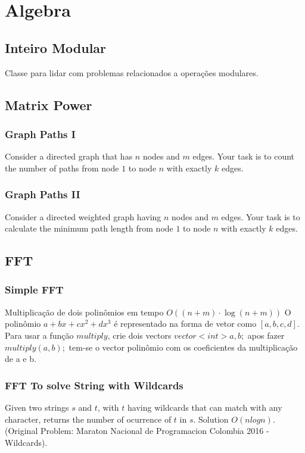 \chapter{Algebra}
    
    \section{Inteiro Modular}
    Classe para lidar com problemas relacionados a operações modulares.
    
    
    \section{Matrix Power}
    \subsection{Graph Paths I}
    Consider a directed graph that has $n$ nodes and $m$ edges. Your task is to count the number of paths from node $1$ to node $n$ with exactly $k$ edges.
    
    
    \subsection{Graph Paths II}
    Consider a directed weighted graph having $n$ nodes and $m$ edges. Your task is to calculate the minimum path length from node $1$ to node $n$ with exactly $k$ edges.
    
    \section{FFT}
    \subsection{Simple FFT}
    Multiplicação de dois polinômios em tempo $O((n+m) \cdot \log(n+m))$
    O polinômio $ a + bx + cx^2 + dx^3$ é representado na forma de vetor como $[a, b, c, d]$.
    Para usar a função $multiply$, crie dois vectors $vector<int> a, b;$ apos fazer $multiply(a, b);$ tem-se o vector polinômio com os coeficientes da multiplicação de a e b.
    
    \subsection{FFT To solve String with Wildcards}
    Given two strings $s$ and $t$, with $t$ having wildcards that can match with any character, returns the number of ocurrence of $t$ in $s$.
    Solution $O(nlogn)$.
    \bigskip
    (Original Problem: Maraton Nacional de Programacion Colombia 2016 - Wildcards).
    
